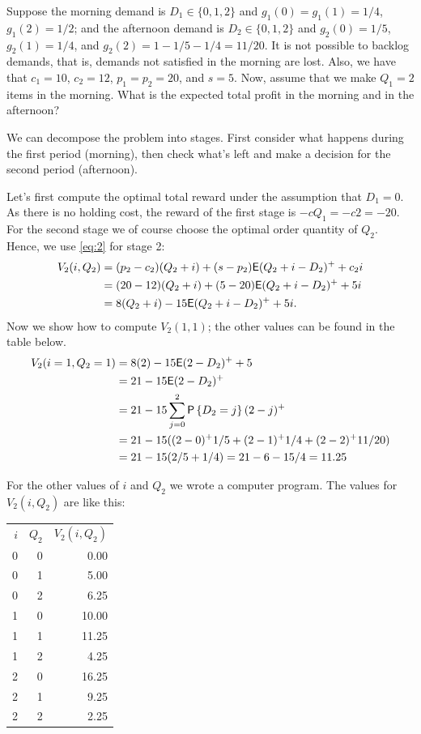 \begin{question}
Suppose the morning demand is $D_1\in \{0,1,2\}$ and $g_1(0)=g_1(1)=1/4$, $g_1(2)=1/2$; and the afternoon demand is $D_2\in \{0,1, 2\}$ and $g_2(0)=1/5$, $g_2(1)=1/4$, and $g_2(2)=1-1/5 - 1/4=11/20$. It is not possible to backlog demands, that is,  demands not satisfied in the morning are lost. Also, we have that $c_1=10$, $c_2=12$, $p_1=p_2=20$, and $s=5$. Now, assume that we make $Q_1=2$ items in the morning. What is the expected total profit in the morning and in the afternoon?  
\begin{solution}
We can decompose the problem into stages. First consider what happens during the first period (morning), then check what's left and make a decision for the second period (afternoon). 

Let's first compute the optimal total reward under the assumption that
$D_1=0$. As there is no holding cost, the reward of the first stage is $-cQ_1 = -c 2 = -20$. For the second stage we of course choose the optimal order quantity of $Q_2$. Hence, we use \eqref{eq:2} for stage 2:
\begin{equation*}
  \begin{split}
V_2(i, Q_2) 
&= (p_2-c_2)(Q_2+i) + (s-p_2)\mathsf{E} (Q_2+i-D_2)^+ + c_2i \\
&= (20-12)(Q_2+i) + (5-20)\mathsf{E} (Q_2+i-D_2)^+ + 5i \\
&= 8(Q_2+i) -15 \mathsf{E} (Q_2+i-D_2)^+ + 5i.
  \end{split}
\end{equation*}
Now we show how to compute $V_2(1,1)$;  the other values can be found in the table below.
\begin{equation*}
  \begin{split}
V_2(i=1,Q_2=1) 
&= 8(2) -15 \ex (2-D_2)^+ + 5\\
&= 21  -15 \ex (2-D_2)^+ \\
&= 21  - 15 \sum_{j=0}^2 \P{D_2 = j} (2-j)^+ \\
&= 21  - 15 ((2-0)^+ 1/5 + (2-1)^+ 1/4+ (2-2)^+11/20) \\
&= 21  - 15 (2/5 + 1/4) = 21 - 6 - 15/4 = 11.25
  \end{split}
\end{equation*}

For the other values of $i$ and $Q_2$ we wrote a computer program. The values for $V_2(i, Q_2)$ are like this:
\begin{center}
\begin{tabular}{rrr}
$i$ & $Q_2$ & $V_2(i, Q_2)$ \\
0 & 0 & 0.00 \\
0 & 1 & 5.00 \\
0 & 2 & 6.25 \\
1 & 0 & 10.00 \\
1 & 1 & 11.25 \\
1 & 2 & 4.25 \\
2 & 0 & 16.25 \\
2 & 1 & 9.25 \\
2 & 2 & 2.25 \\
\end{tabular}
\end{center}


\end{solution}
\end{question}
